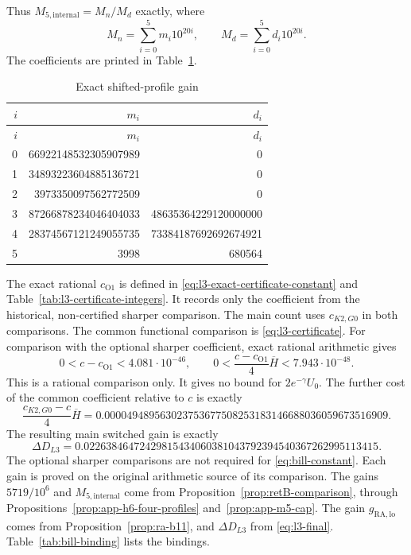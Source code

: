 Thus $M_{5,\mathrm{internal}}=M_n/M_d$ exactly, where
\begin{equation}\label{eq:bill-M5-integers}
 M_n=\sum_{i=0}^5m_i10^{20i},\qquad
 M_d=\sum_{i=0}^5d_i10^{20i}.
\end{equation}
The coefficients are printed in Table~\ref{tab:bill-M5-integers}.
\begingroup
\small
\setlength{\tabcolsep}{8pt}
\renewcommand{\arraystretch}{1.25}
\begin{longtable}{@{}rrr@{}}
\caption{Exact shifted-profile gain}\label{tab:bill-M5-integers}\\
\hline
$i$ & $m_i$ & $d_i$\\
\hline
\endfirsthead
\hline
$i$ & $m_i$ & $d_i$\\
\hline
\endhead
0 & 66922148532305907989 & 0\\
1 & 34893223604885136721 & 0\\
2 & 3973350097562772509 & 0\\
3 & 87266878234046404033 & 48635364229120000000\\
4 & 28374567121249055735 & 73384187692692674921\\
5 & 3998 & 680564\\
\hline
\end{longtable}
\endgroup
The exact rational $c_{\mathrm{O1}}$ is defined in
\eqref{eq:l3-exact-certificate-constant} and
Table~\ref{tab:l3-certificate-integers}.
It records only the coefficient from the historical, non-certified
sharper comparison.
The main count uses $c_{K2,G0}$ in both comparisons.
The common functional comparison is \eqref{eq:l3-certificate}.
For comparison with the optional sharper coefficient, exact rational
arithmetic gives
\begin{equation}\label{eq:bill-coefficient-cost}
 0<c-c_{\mathrm{O1}}<4.081\cdot10^{-46},\qquad
 0<\frac{c-c_{\mathrm{O1}}}{4}\overline H
                  <7.943\cdot10^{-48}.
\end{equation}
This is a rational comparison only. It gives no bound for $2e^{-\gamma}U_0$.
The further cost of the common coefficient relative to \(c\) is exactly
\[
 \frac{c_{K2,G0}-c}{4}\overline H
 =0.000049489563023753677508253183146688036059673516909.
\]
The resulting main switched gain is exactly
\[
 \Delta D_{L3}=0.02263846472429815434060381043792394540367262995113415.
\]
The optional sharper comparisons are not required for \eqref{eq:bill-constant}.
Each gain is proved on the original arithmetic source of its comparison.
The gains $5719/10^6$ and $M_{5,\mathrm{internal}}$ come from
Proposition~\ref{prop:retB-comparison}, through
Propositions~\ref{prop:app-h6-four-profiles} and~\ref{prop:app-m5-cap}.
The gain $g_{\mathrm{RA,lo}}$ comes from Proposition~\ref{prop:ra-b11}, and
$\Delta D_{L3}$ from \eqref{eq:l3-final}. Table~\ref{tab:bill-binding} lists the bindings.

